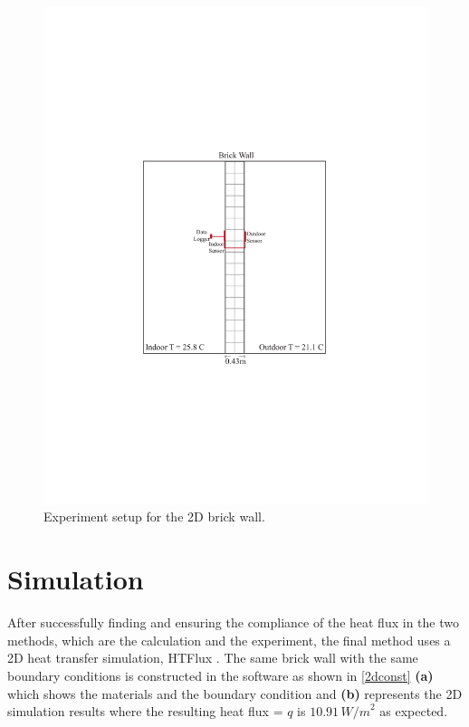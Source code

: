 \begin{figure}[tbh]
  \centering
  \includegraphics[trim=5.6cm 7.5cm 5.3cm 8cm, clip, width=.7\linewidth]{Figures/2dsection2.pdf}
\caption[2D Section and Setup]{Experiment setup for the 2D brick wall.}
\label{fig:2d2}
\end{figure}




















\section{Simulation}

After successfully finding and ensuring the compliance of the heat flux in the two methods, which are the calculation and the experiment, the final method uses a 2D heat transfer simulation, HTFlux \cite{HTflux}. The same brick wall with the same boundary conditions is constructed in the software as shown in \ref{2dconst} \textbf{(a)} which shows the materials and the boundary condition and \textbf{(b)} represents the 2D simulation results where the resulting heat flux = \( q \) is \( 10.91 \, {W/m}^2 \) as expected.





